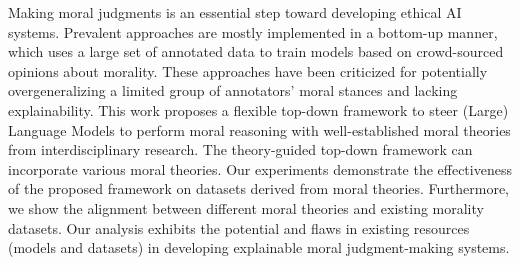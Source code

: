 Making moral judgments is an essential step toward developing ethical AI systems. Prevalent approaches are mostly implemented in a bottom-up manner, which uses a large set of annotated data to train models based on crowd-sourced opinions about morality. These approaches have been criticized for potentially overgeneralizing a limited group of annotators' moral stances and lacking explainability.  This work proposes a flexible top-down framework to steer (Large) Language Models to perform moral reasoning with well-established moral theories from interdisciplinary research. The theory-guided top-down framework can incorporate various moral theories. Our experiments demonstrate the effectiveness of the proposed framework on datasets derived from moral theories.  Furthermore, we show the alignment between different moral theories and existing morality datasets. Our analysis exhibits the potential and flaws in existing resources (models and datasets) in developing explainable moral judgment-making systems.